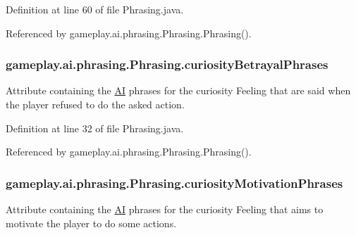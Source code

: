 Definition at line 60 of file Phrasing.\-java.



Referenced by gameplay.\-ai.\-phrasing.\-Phrasing.\-Phrasing().

\hypertarget{a00018_a10f436b3727af6eedab39a382801306c}{
\subsubsection[{curiosity\-Betrayal\-Phrases}]{ gameplay.\-ai.\-phrasing.\-Phrasing.\-curiosity\-Betrayal\-Phrases\hspace{0.3cm}{\ttfamily [protected]}}}\label{a00018_a10f436b3727af6eedab39a382801306c}


Attribute containing the \hyperlink{a00001}{A\-I} phrases for the curiosity Feeling that are said when the player refused to do the asked action. 



Definition at line 32 of file Phrasing.\-java.



Referenced by gameplay.\-ai.\-phrasing.\-Phrasing.\-Phrasing().

\hypertarget{a00018_ad82ede6d0263d91e13511606f6696a18}{
\subsubsection[{curiosity\-Motivation\-Phrases}]{ gameplay.\-ai.\-phrasing.\-Phrasing.\-curiosity\-Motivation\-Phrases\hspace{0.3cm}{\ttfamily [protected]}}}\label{a00018_ad82ede6d0263d91e13511606f6696a18}


Attribute containing the \hyperlink{a00001}{A\-I} phrases for the curiosity Feeling that aims to motivate the player to do some actions. 



